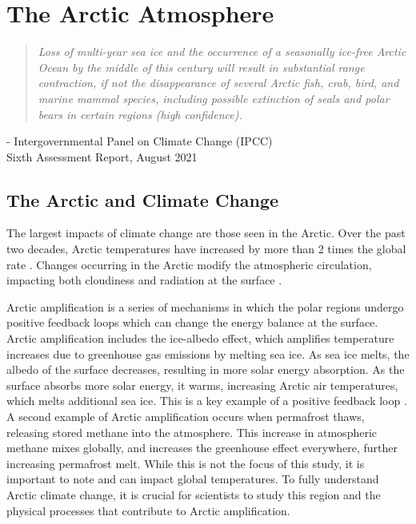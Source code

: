 \chapter{The Arctic Atmosphere}
\vspace{1 cm}
\begin{spacing}{1} \begin{quote} 
\noindent \emph{Loss of multi-year sea ice and the occurrence of a seasonally ice-free Arctic Ocean by the middle of this century will result in substantial range contraction, if not the disappearance of several Arctic fish, crab, bird, and marine mammal species, including possible extinction of seals and polar bears in certain regions (high confidence).} \end{quote}
\hspace{6 cm} - Intergovernmental Panel on Climate Change (IPCC) \\
\hspace*{6.7 cm} Sixth Assessment Report, August 2021  
\end{spacing}
\doublespacing
\section{The Arctic and Climate Change}
The largest impacts of climate change are those seen in the Arctic. Over the past two decades, Arctic temperatures have increased by more than 2 times the global rate \citep{IPCC:14}. Changes occurring in the Arctic modify the atmospheric circulation, impacting both cloudiness and radiation at the surface \citep{zhang:2008}.
 
Arctic amplification is a series of mechanisms in which the polar regions undergo positive feedback loops which can change the energy balance at the surface. Arctic amplification includes the ice-albedo effect, which amplifies temperature increases due to greenhouse gas emissions by melting sea ice. As sea ice melts, the albedo of the surface decreases, resulting in more solar energy absorption. As the surface absorbs more solar energy, it warms, increasing Arctic air temperatures, which melts additional sea ice. This is a key example of a positive feedback loop \citep{ipcc_techsum}. A second example of Arctic amplification occurs when permafrost thaws, releasing stored methane into the atmosphere. This increase in atmospheric methane mixes globally, and increases the greenhouse effect everywhere, further increasing permafrost melt. While this is not the focus of this study, it is important to note and can impact global temperatures. To fully understand Arctic climate change, it is crucial for scientists to study this region and the physical processes that contribute to Arctic amplification.

